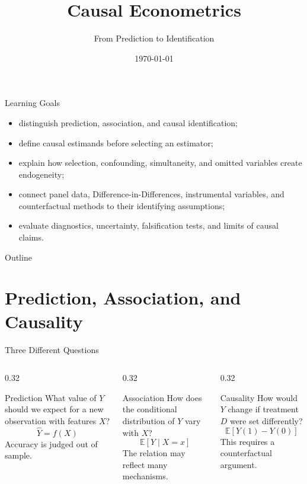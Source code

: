 \documentclass[aspectratio=169,11pt]{beamer}
\title[Causal Econometrics]{Causal Econometrics}
\subtitle{From Prediction to Identification}
\date{\today}
\newcommand{\E}{\mathbb{E}}
\begin{document}
\begin{frame}
\titlepage
\end{frame}

\begin{frame}{Learning Goals}
\begin{itemize}
\item distinguish prediction, association, and causal identification;
\item define causal estimands before selecting an estimator;
\item explain how selection, confounding, simultaneity, and omitted variables create endogeneity;
\item connect panel data, Difference-in-Differences, instrumental variables, and counterfactual methods to their identifying assumptions;
\item evaluate diagnostics, uncertainty, falsification tests, and limits of causal claims.
\end{itemize}
\end{frame}

\begin{frame}{Outline}
\tableofcontents
\end{frame}

\section{Prediction, Association, and Causality}

\begin{frame}{Three Different Questions}
\begin{columns}[T]
\begin{column}{0.32\textwidth}
\begin{block}{Prediction}
What value of \(Y\) should we expect for a new observation with features \(X\)?
\[
\widehat{Y}=f(X)
\]
Accuracy is judged out of sample.
\end{block}
\end{column}
\begin{column}{0.32\textwidth}
\begin{block}{Association}
How does the conditional distribution of \(Y\) vary with \(X\)?
\[
\E[Y\mid X=x]
\]
The relation may reflect many mechanisms.
\end{block}
\end{column}
\begin{column}{0.32\textwidth}
\begin{alertblock}{Causality}
How would \(Y\) change if treatment \(D\) were set differently?
\[
\E[Y(1)-Y(0)]
\]
This requires a counterfactual argument.
\end{alertblock}
\end{column}
\end{columns}
\end{frame}
\end{document}
